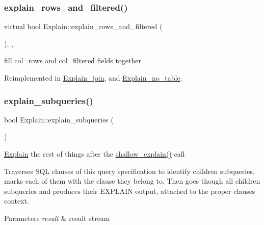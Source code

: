 \subsubsection{\texorpdfstring{explain\+\_\+rows\+\_\+and\+\_\+filtered()}{explain\_rows\_and\_filtered()}}
{\footnotesize\ttfamily virtual bool Explain\+::explain\+\_\+rows\+\_\+and\+\_\+filtered (\begin{DoxyParamCaption}{ }\end{DoxyParamCaption})\hspace{0.3cm}{\ttfamily [inline]}, {\ttfamily [protected]}, {\ttfamily [virtual]}}

fill col\+\_\+rows and col\+\_\+filtered fields together 

Reimplemented in \mbox{\hyperlink{classExplain__join_a407564ac2ce390da3f0edd30eb3b4a06}{Explain\+\_\+join}}, and \mbox{\hyperlink{classExplain__no__table_a6713209630b904160dfc00bac9841370}{Explain\+\_\+no\+\_\+table}}.

\mbox{\label{classExplain_ade38da9640240663e08eb144a2253e55}} 
\subsubsection{\texorpdfstring{explain\+\_\+subqueries()}{explain\_subqueries()}}
{\footnotesize\ttfamily bool Explain\+::explain\+\_\+subqueries (\begin{DoxyParamCaption}{ }\end{DoxyParamCaption})\hspace{0.3cm}{\ttfamily [protected]}}

\mbox{\hyperlink{classExplain}{Explain}} the rest of things after the {\ttfamily \mbox{\hyperlink{classExplain_a2b5b074864b25d4bb669047dbcae8abb}{shallow\+\_\+explain()}}} call

Traverses S\+QL clauses of this query specification to identify children subqueries, marks each of them with the clause they belong to. Then goes though all children subqueries and produces their E\+X\+P\+L\+A\+IN output, attached to the proper clause\textquotesingle{}s context.


\begin{DoxyParams}{Parameters}
{\em result} & result stream\\
\hline
\end{DoxyParams}

